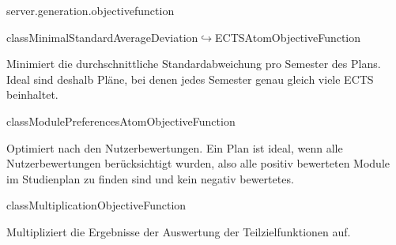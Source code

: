\begin{texdocpackage}{server.generation.objectivefunction}
\begin{texdocclass}{class}{MinimalStandardAverageDeviation\newline$\hookrightarrow$ECTSAtomObjectiveFunction}
\label{texdoclet:edu.kit.informatik.studyplan.server.generation.objectivefunction.MinimalStandardAverageDeviationECTSAtomObjectiveFunction}
\begin{texdocclassintro}
Minimiert die durchschnittliche Standardabweichung pro Semester des Plans. 
 Ideal sind deshalb Pläne, bei denen jedes Semester genau gleich viele ECTS beinhaltet.\end{texdocclassintro}
\begin{texdocclassconstructors}
\end{texdocclassconstructors}
\begin{texdocclassmethods}
\end{texdocclassmethods}
\end{texdocclass}


\begin{texdocclass}{class}{ModulePreferencesAtomObjectiveFunction}
\label{texdoclet:edu.kit.informatik.studyplan.server.generation.objectivefunction.ModulePreferencesAtomObjectiveFunction}
\begin{texdocclassintro}
Optimiert nach den Nutzerbewertungen. Ein Plan ist ideal, wenn alle Nutzerbewertungen berücksichtigt wurden, 
 also alle positiv bewerteten Module im Studienplan zu finden sind und kein negativ bewertetes.\end{texdocclassintro}
\begin{texdocclassconstructors}
\end{texdocclassconstructors}
\begin{texdocclassmethods}
\end{texdocclassmethods}
\end{texdocclass}


\begin{texdocclass}{class}{MultiplicationObjectiveFunction}
\label{texdoclet:edu.kit.informatik.studyplan.server.generation.objectivefunction.MultiplicationObjectiveFunction}
\begin{texdocclassintro}
Multipliziert die Ergebnisse der Auswertung der Teilzielfunktionen auf.\end{texdocclassintro}
\begin{texdocclassconstructors}
\end{texdocclassconstructors}
\begin{texdocclassmethods}
\end{texdocclassmethods}
\end{texdocclass}



\end{texdocpackage}
